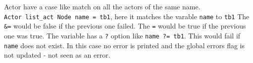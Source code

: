 Actor have a case like match on all the actors of the same name.
\texttt{Actor\ list\_act\ Node\ name\ =\ tb1}, here it matches the
varable \texttt{name} to \texttt{tb1} The \texttt{\&=} would be false if
the previous one failed. The \texttt{\textbar{}=} would be true if the
previous one was true. The variable has a \texttt{?} option like
\texttt{name\ ?=\ tb1}. This would fail if \texttt{name} does not exist.
In this case no error is printed and the global errors flag is not
updated - not seen as an error.
